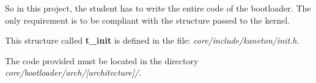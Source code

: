 So in this project, the student has to write the entire code of the
bootloader. The only requirement is to be compliant with the structure
passed to the kernel.

This structure called \textbf{t\_init} is defined in the
file: \textit{core/include/kaneton/init.h}.

The code provided must be located in the directory
\textit{core/bootloader/arch/[architecture]/}.

%
%

%
%

%
%

%
%

%
%




